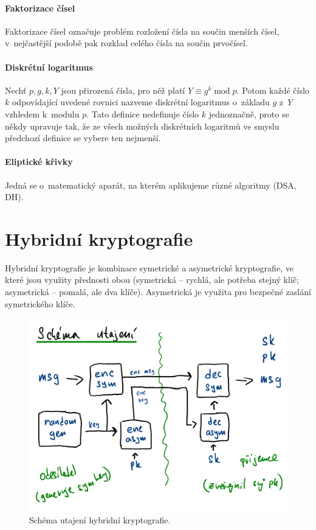 \paragraph*{Faktorizace čísel} Faktorizace čísel označuje problém rozložení čísla na součin menších čísel, v~nejčastější podobě pak rozklad celého čísla na součin prvočísel.

\paragraph*{Diskrétní logaritmus} Nechť $p, g, k, Y$ jsou přirozená čísla, pro něž platí $Y \equiv g^{k} \; \text{mod} \; p$. Potom každé číslo $k$ odpovídající uvedené rovnici nazveme diskrétní logaritmus o~základu $g$ z~$Y$ vzhledem k~modulu $p$. Tato definice nedefinuje číslo $k$ jednoznačně, proto se někdy upravuje tak, že ze všech možných diskrétních logaritmů ve smyslu předchozí definice se vybere ten nejmenší.

\paragraph*{Eliptické křivky} Jedná se o~matematický aparát, na kterém aplikujeme různé algoritmy (DSA, DH).


\section{Hybridní kryptografie}

Hybridní kryptografie je kombinace symetrické a asymetrické kryptografie, ve které jsou využity přednosti obou (symetrická -- rychlá, ale potřeba stejný klíč; asymetrická -- pomalá, ale dva klíče). Asymetrická je využita pro bezpečné zaslání symetrického klíče.

\begin{figure}[H]
    \centering
    \includegraphics[width=1\linewidth]{hybrid_utajeni.pdf}
    \caption{Schéma utajení hybridní kryptografie.}
\end{figure}

